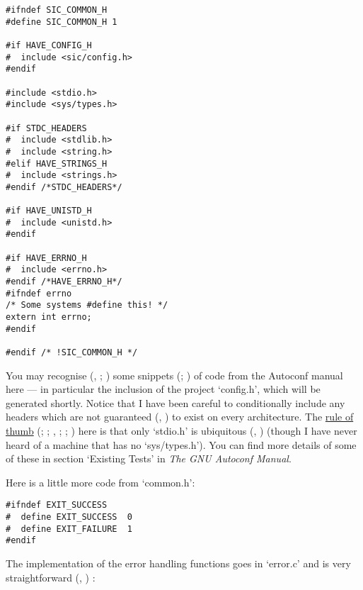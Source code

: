 \begin{Verbatim}[frame=single]
#ifndef SIC_COMMON_H
#define SIC_COMMON_H 1

#if HAVE_CONFIG_H
#  include <sic/config.h>
#endif

#include <stdio.h>
#include <sys/types.h>

#if STDC_HEADERS
#  include <stdlib.h>
#  include <string.h>
#elif HAVE_STRINGS_H
#  include <strings.h>
#endif /*STDC_HEADERS*/

#if HAVE_UNISTD_H
#  include <unistd.h>
#endif

#if HAVE_ERRNO_H
#  include <errno.h>
#endif /*HAVE_ERRNO_H*/
#ifndef errno
/* Some systems #define this! */
extern int errno;
#endif

#endif /* !SIC_COMMON_H */
\end{Verbatim}

You may recognise ({\McQ{}}, {\McQ{}}; {\McQ{}}) some snippets ({\MdQ{}}; {\MbQ{}}) of code 
from the Autoconf manual here --- in particular the inclusion of the project 
`config.h', which will be generated shortly. Notice that I have been careful 
to conditionally include any headers which are not guaranteed ({\MbQ{}}, {\MiQ{}}) 
to exist on every architecture. The \underline{rule of thumb}
({\MaQ{}}; {\MbQ{}}; {\McQ{}}, {\MeQ{}}; {\McQ{}}; {\McQ{}}) here is that 
only `stdio.h' is ubiquitous ({\MaQ{}}, {\MgQ{}}) (though I have never 
heard of a machine that has no `sys/types.h'). You can find more details of 
some of these in section `Existing Tests' in \textit{The GNU Autoconf Manual}. 


Here is a little more code from `common.h': 

\begin{Verbatim}[frame=single]
#ifndef EXIT_SUCCESS
#  define EXIT_SUCCESS  0
#  define EXIT_FAILURE  1
#endif
\end{Verbatim}

The implementation of the error handling functions goes in `error.c' and is 
very straightforward ({\MbQ{}}, {\MiQ{}}) : 

